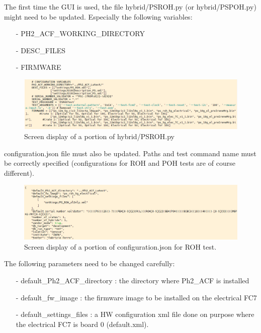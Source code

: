 \documentclass[10pt,a4paper]{article}
\begin{document}
The first time the GUI is used, the file hybrid/PSROH.py (or hybrid/PSPOH.py) might need to be updated. Especially the following variables:
\begin{itemize}
\item[-] PH2\_ACF\_WORKING\_DIRECTORY
\item[-] DESC\_FILES
\item[-] FIRMWARE
\end{itemize}

\begin{figure}[h!]
\centering
 \includegraphics[width=\linewidth]{psroh.png} 
  \caption{Screen display of a portion of hybrid/PSROH.py}
  \label{screenshot}	
\end{figure}

configuration.json file must also be updated. Paths and test command name must be correctly specified (configurations for ROH and POH tests are of course different).
\begin{figure}[h!]
\centering
 \includegraphics[width=\linewidth]{configuration.png} 
  \caption{Screen display of a portion of configuration.json for ROH test.}
\end{figure}

The following parameters need to be changed carefully:
\begin{itemize}
\item[-] default\_Ph2\_ACF\_directory : the directory where Ph2\_ACF is installed
\item[-] default\_fw\_image : the firmware image to be installed on the electrical FC7
\item[-] default\_settings\_files : a HW configuration xml file done on purpose where the electrical FC7 is board 0 (default.xml). 
\end{itemize}
\end{document}
